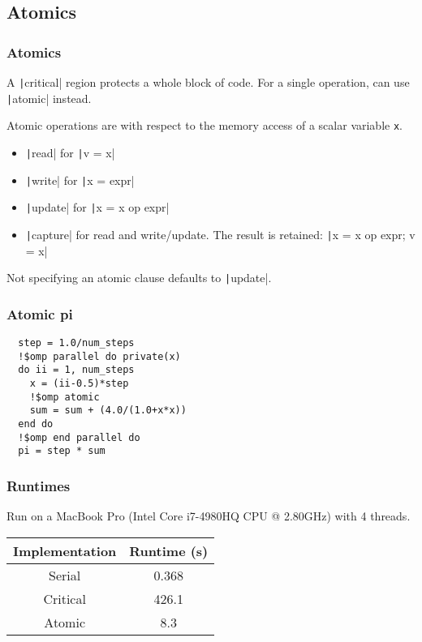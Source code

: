 \documentclass{beamer}
\begin{document}
\subsection{Atomics}
\begin{frame}[fragile]
\frametitle{Atomics}
A \texttt|critical| region protects a whole block of code. For a single operation, can use \texttt|atomic| instead.

Atomic operations are with respect to the memory access of a scalar variable {\tt x}.

\begin{itemize}
  \item \texttt|read| for \texttt|v = x|
  \item \texttt|write| for \texttt|x = expr|
  \item \texttt|update| for \texttt|x = x op expr|
  \item \texttt|capture| for read and write/update. The result is retained: \texttt|x = x op expr; v = x|
\end{itemize}

Not specifying an atomic clause defaults to \texttt|update|.
\end{frame}

\begin{frame}[fragile]
\frametitle{Atomic pi}
\begin{verbatim}
  step = 1.0/num_steps
  !$omp parallel do private(x)
  do ii = 1, num_steps
    x = (ii-0.5)*step
    !$omp atomic
    sum = sum + (4.0/(1.0+x*x))
  end do
  !$omp end parallel do
  pi = step * sum
\end{verbatim}
\end{frame}

\begin{frame}
\frametitle{Runtimes}
Run on a MacBook Pro (Intel Core i7-4980HQ CPU @ 2.80GHz) with 4 threads.

\begin{table}
\begin{tabular}{cc}
\toprule
Implementation & Runtime (s) \\
\midrule
Serial   & 0.368 \\
Critical & 426.1 \\
Atomic   & 8.3 \\
\bottomrule
\end{tabular}
\end{table}
\end{frame}
\end{document}
